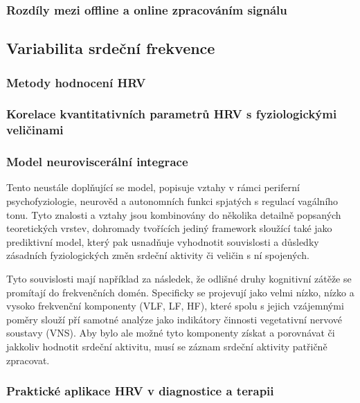 \subsubsection{Rozdíly mezi offline a online zpracováním signálu}

\subsection{Variabilita srdeční frekvence}
\label{section:hrv}

\subsubsection{Metody hodnocení HRV}
\subsubsection{Korelace kvantitativních parametrů HRV s fyziologickými veličinami}
\subsubsection{Model neuroviscerální integrace}
Tento neustále doplňující se model, popisuje vztahy v rámci periferní
psychofyziologie, neurověd a autonomních funkci spjatých s regulací vagálního
tonu. Tyto znalosti a vztahy jsou kombinovány do několika detailně popsaných
teoretických vrstev, dohromady tvořících jediný framework sloužící také jako
prediktivní model, který pak usnadňuje vyhodnotit souvislosti a důsledky
zásadních fyziologických změn srdeční aktivity či veličin s ní spojených.

Tyto souvislosti mají například za následek, že odlišné druhy kognitivní zátěže
se promítají do frekvenčních domén. Specificky se projevují jako velmi nízko,
nízko a vysoko frekvenční komponenty (VLF, LF, HF), které spolu s jejich
vzájemnými poměry slouží pří samotné analýze jako indikátory činnosti
vegetativní nervové soustavy (VNS). Aby bylo ale možné tyto komponenty získat a
porovnávat či jakkoliv hodnotit srdeční aktivitu, musí se záznam srdeční
aktivity patřičně zpracovat.
\subsubsection{Praktické aplikace HRV v diagnostice a terapii}
